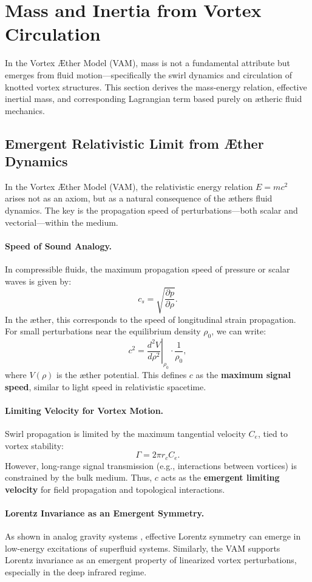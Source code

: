 \section{Mass and Inertia from Vortex Circulation}

In the Vortex Æther Model (VAM), mass is not a fundamental attribute but emerges from fluid motion—specifically the swirl dynamics and circulation of knotted vortex structures. This section derives the mass-energy relation, effective inertial mass, and corresponding Lagrangian term based purely on ætheric fluid mechanics.

\subsection{Emergent Relativistic Limit from Æther Dynamics}

In the Vortex Æther Model (VAM), the relativistic energy relation \( E = mc^2 \) arises not as an axiom, but as a natural consequence of the æther\rqs s fluid dynamics. The key is the propagation speed of perturbations—both scalar and vectorial—within the medium.

\paragraph{Speed of Sound Analogy.}
In compressible fluids, the maximum propagation speed of pressure or scalar waves is given by:
\[
    c_s = \sqrt{\frac{\partial p}{\partial \rho}}.
\]
In the æther, this corresponds to the speed of longitudinal strain propagation. For small perturbations near the equilibrium density \( \rho_0 \), we can write:
\[
    c^2 = \left.\frac{d^2 V}{d\rho^2} \right|_{\rho_0} \cdot \frac{1}{\rho_0},
\]
where \( V(\rho) \) is the æther potential. This defines \( c \) as the \textbf{maximum signal speed}, similar to light speed in relativistic spacetime.

\paragraph{Limiting Velocity for Vortex Motion.}
Swirl propagation is limited by the maximum tangential velocity \( C_e \), tied to vortex stability:
\[
    \Gamma = 2\pi r_c C_e.
\]
However, long-range signal transmission (e.g., interactions between vortices) is constrained by the bulk medium. Thus, \( c \) acts as the \textbf{emergent limiting velocity} for field propagation and topological interactions.

\paragraph{Lorentz Invariance as an Emergent Symmetry.}
As shown in analog gravity systems \cite{barcelo2011}, effective Lorentz symmetry can emerge in low-energy excitations of superfluid systems. Similarly, the VAM supports Lorentz invariance as an emergent property of linearized vortex perturbations, especially in the deep infrared regime.


